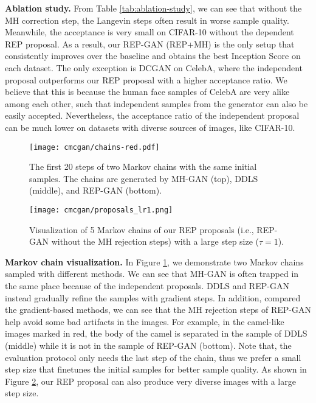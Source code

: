 \documentclass{article} %
\newcommand{\<}{\left\langle}
\renewcommand{\>}{\right\rangle}
\begin{document}
\textbf{Ablation study.} From Table \ref{tab:ablation-study}, we can see that without the MH correction step, the Langevin steps often result in worse sample quality. Meanwhile, the acceptance is very small on CIFAR-10 without the dependent REP proposal. As a result, our REP-GAN (REP+MH) is the only setup that consistently improves over the baseline and obtains the best Inception Score on each dataset. The only exception is DCGAN on CelebA, where the independent proposal outperforms our REP proposal with a higher acceptance ratio. We believe that this is because the human face samples of CelebA are very alike among each other, such that independent samples from the generator can also be easily accepted. Nevertheless, the acceptance ratio of the independent proposal can be much lower on datasets with diverse sources of images, like CIFAR-10.


\begin{figure}[h]\centering
\texttt{[image: cmcgan/chains-red.pdf]}
\caption{The first 20 steps of two Markov chains with the same initial samples. The chains are generated by 
MH-GAN (top), DDLS (middle), and REP-GAN (bottom).}
\label{fig:sampled-chain}
\end{figure}


\begin{figure}[h]
    \centering
    \texttt{[image: cmcgan/proposals\_lr1.png]}
    \caption{Visualization of 5 Markov chains of our REP proposals (i.e., REP-GAN without the MH rejection steps) with a large step size ($\tau=1$).}
    \label{fig:proposals}
\end{figure}

\textbf{Markov chain visualization.} In Figure \ref{fig:sampled-chain}, we demonstrate two Markov chains sampled with different methods.  We can see that 
MH-GAN is often trapped in the same place because of the independent proposals. DDLS and REP-GAN instead gradually refine the samples with gradient steps. In addition, compared the gradient-based methods, we can see that the MH rejection steps of REP-GAN help avoid some bad artifacts in the images. For example, in the camel-like images marked in red, the body of the camel is separated in the sample of DDLS (middle) while it is not in the sample of REP-GAN (bottom). 
Note that, the evaluation protocol only needs the last step of the chain, thus we prefer a small step size that finetunes the initial samples for better sample quality. As shown in Figure \ref{fig:proposals}, our REP proposal can also produce very diverse images with a large step size. 
\end{document}
